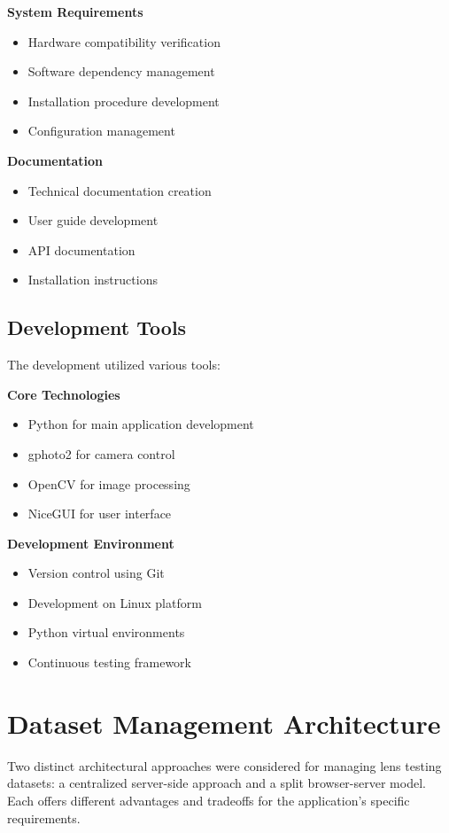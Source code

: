 \textbf{System Requirements}
\begin{itemize}
    \item Hardware compatibility verification
    \item Software dependency management
    \item Installation procedure development
    \item Configuration management
\end{itemize}

\textbf{Documentation}
\begin{itemize}
    \item Technical documentation creation
    \item User guide development
    \item API documentation
    \item Installation instructions
\end{itemize}

\subsection{Development Tools}
The development utilized various tools:

\textbf{Core Technologies}
\begin{itemize}
    \item Python for main application development
    \item gphoto2 for camera control
    \item OpenCV for image processing
    \item NiceGUI for user interface
\end{itemize}

\textbf{Development Environment}
\begin{itemize}
    \item Version control using Git
    \item Development on Linux platform
    \item Python virtual environments
    \item Continuous testing framework
\end{itemize}


\section{Dataset Management Architecture}

Two distinct architectural approaches were considered for managing lens testing datasets: a centralized server-side approach and a split browser-server model. Each offers different advantages and tradeoffs for the application's specific requirements.

